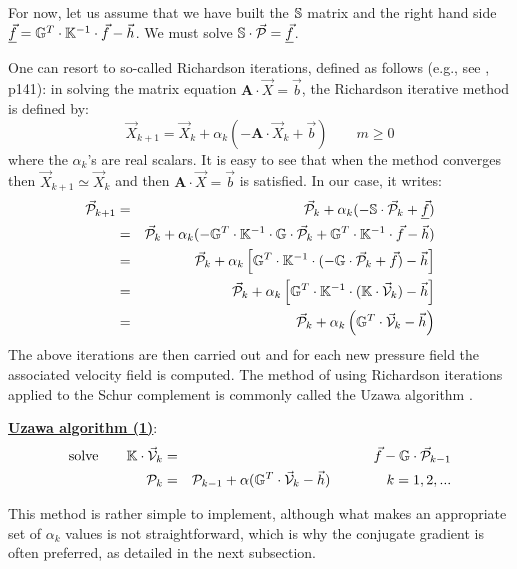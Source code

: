 For now, let us assume that we have built the ${\mathbb{S}}$ matrix and the right hand 
side $\underline{\vec{f}}={\mathbb{G}}^T \cdot {\mathbb{K}}^{-1} \cdot \vec{f} - \vec{h}$.
We must solve ${\mathbb{S}}\cdot \vec{\cal P} = \underline{\vec{f}}$.

One can resort to so-called Richardson iterations, defined as follows (e.g., see \cite{varga}, p141):
in solving the matrix equation ${\bm A}\cdot {\vec X}={\vec b}$,
the Richardson iterative method is defined by: 
\[
{\vec X}_{k+1} = {\vec X}_k + \alpha_k (-{\bm A} \cdot {\vec X}_k + {\vec b})
\quad\quad
m\geq 0 
\]
where the $\alpha_k$'s are real scalars. 
It is easy to see that when the method converges then ${\vec X}_{k+1} \simeq {\vec X}_k$  and then 
${\bm A}\cdot {\vec X}={\vec b}$ is satisfied. 
In our case, it writes:
\begin{eqnarray}
\vec {\cal P}_{k+1} 
&=& \vec {\cal P}_k + \alpha_k ( - {\mathbb{S}} \cdot \vec{\cal P}_k  +  \underline{\vec{f}}) \nonumber\\
&=& \vec {\cal P}_k + \alpha_k ( - {\mathbb{G}}^T \cdot {\mathbb{K}}^{-1} \cdot {\mathbb{G}} \cdot \vec{\cal P}_k  
+  {\mathbb{G}}^T \cdot {\mathbb{K}}^{-1} \cdot \vec{f} - \vec{h}   ) \nonumber\\
&=& \vec {\cal P}_k + \alpha_k \left[ {\mathbb{G}}^T \cdot {\mathbb{K}}^{-1} \cdot ( - {\mathbb{G}} \cdot \vec{\cal P}_k + \vec{f}) - \vec{h} \right] \nonumber\\
&=& \vec {\cal P}_k + \alpha_k \left[ {\mathbb{G}}^T \cdot {\mathbb{K}}^{-1} \cdot ( {\mathbb{K}}\cdot \vec{\cal V}_k)  - \vec{h} \right] \nonumber\\
&=& \vec {\cal P}_k + \alpha_k \left( {\mathbb{G}}^T \cdot \vec{\cal V}_k  - \vec{h} \right) 
\end{eqnarray}
The above iterations are then carried out and for each new pressure field the associated velocity field 
is computed. The method of using Richardson iterations applied to the Schur complement 
is commonly called the Uzawa algorithm \cite[p221]{braess}.

\begin{mdframed}[backgroundcolor=blue!5]
\underline{\bf Uzawa algorithm (1)}:
\begin{eqnarray}
\text{solve} \qquad \mathbb{K} \cdot \vec{\cal V}_k &=& \vec f - \mathbb{G}\cdot \vec {\cal P}_{k-1} \\
{\cal P}_k &=& {\cal P}_{k-1}  + \alpha (\mathbb{G}^T\cdot \vec{\cal V}_k -\vec h)
\quad
\quad
\quad
\quad
k=1,2, ... \label{uzaa2}
\end{eqnarray}
\end{mdframed}


This method is rather simple to implement, although
what makes an appropriate set of $\alpha_k$ values is not straightforward, which is why 
the conjugate gradient is often preferred, as detailed in the next subsection. 

